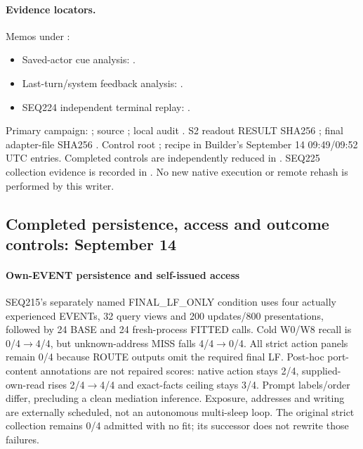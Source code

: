 \documentclass[11pt]{article}
\begin{document}
\paragraph{Evidence locators.}
Memos under :
\begin{itemize}
\item Saved-actor cue analysis: .
\item Last-turn/system feedback analysis: .
\item SEQ224 independent terminal replay: .
\end{itemize}
Primary campaign: ;
source ;
local audit .
S2 readout RESULT SHA256
;
final adapter-file SHA256
.
Control root ;
recipe in Builder's September 14 09:49/09:52 UTC entries. Completed controls
are independently reduced in
.
SEQ225 collection evidence is recorded in .
No new native execution or remote rehash is performed by this writer.

\subsection{Completed persistence, access and outcome controls: September 14}
\label{sec:sep14-results}
\paragraph{Own-EVENT persistence and self-issued access}

SEQ215's separately named FINAL\_LF\_ONLY condition uses four actually experienced
EVENTs, 32 query views and 200 updates/800 presentations, followed by 24 BASE
and 24 fresh-process FITTED calls. Cold W0/W8 recall is 0/4$\to$4/4, but
unknown-address MISS falls 4/4$\to$0/4. All strict action panels remain 0/4 because
ROUTE outputs omit the required final LF. Post-hoc port-content annotations
are not repaired scores: native action stays 2/4, supplied-own-read rises
2/4$\to$4/4 and exact-facts ceiling stays 3/4. Prompt labels/order differ, precluding
a clean mediation inference. Exposure, addresses and writing are externally
scheduled, not an autonomous multi-sleep loop. The original strict collection
remains 0/4 admitted with no fit; its successor does not rewrite those failures.
\end{document}
